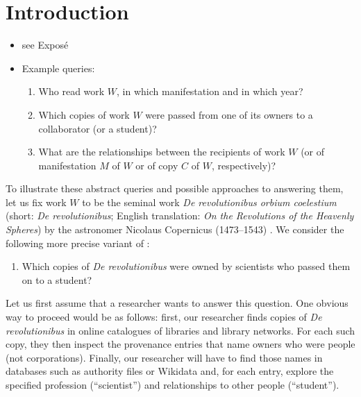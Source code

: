 
\chapter{Introduction}
\label{chap:intro}

\begin{itemize}
  \item
    see Exposé
  \item
    Example queries:
    \begin{enumerate}
      \item[\exaquery{1}]
        Who read work $W$, in which manifestation and in which year?
      \item[\exaquery{2}]
        Which copies of work $W$ were passed from one of its owners to a collaborator (or a student)?
      \item[\exaquery{3}]
        What are the relationships between the recipients of work $W$
        (or of manifestation $M$ of $W$ or of copy $C$ of $W$, respectively)?
    \end{enumerate}
\end{itemize}
%
To illustrate these abstract queries and possible approaches to answering them, let us fix work $W$ to be the seminal work \emph{De revolutionibus orbium coelestium}
(short: \emph{De revolutionibus}; English translation: \emph{On the Revolutions of the Heavenly Spheres}) by the astronomer Nicolaus Copernicus (1473–1543) .
We consider the following more precise variant of :
%
\begin{enumerate}
  \item[\exaquery{2$'$}]
    Which copies of \emph{De revolutionibus} were owned by scientists who passed them on to a student?
\end{enumerate}
%
Let us first assume that a researcher wants to answer this question.
One obvious way to proceed would be as follows: first, our researcher finds copies of \emph{De revolutionibus} 
in online catalogues of libraries and library networks. For each such copy, they then inspect the provenance entries
that name owners who were people (not corporations). Finally, our researcher will have to find those names in databases such as
authority files or Wikidata and, for each entry, explore the specified profession (``scientist'') and relationships to other people (``student'').

